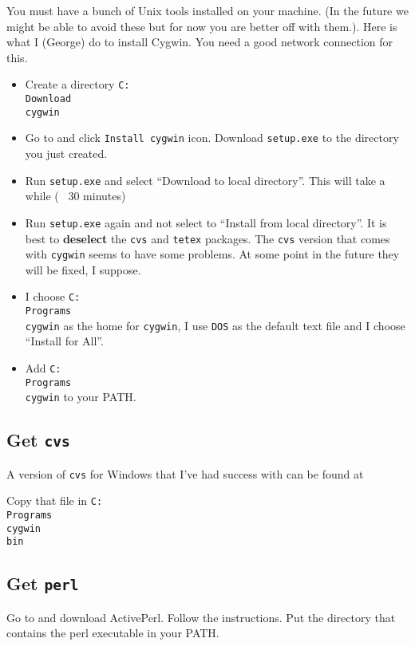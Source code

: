 \documentclass{book}
\def\t#1{{\tt #1}}
\begin{document}
 You must have a bunch of Unix tools installed on your machine. (In the future
we might be able to avoid these but for now you are better off with them.).
Here is what I (George) do to install Cygwin. You need a good network
connection for this. 
\begin{itemize}
\item Create a directory \t{C:\\Download\\cygwin}
\item Go to  and click \t{Install
cygwin} icon. Download \t{setup.exe} to the directory you just created.
\item Run \t{setup.exe} and select ``Download to local directory''. This will
take a while (~ 30 minutes)
\item Run \t{setup.exe} again and not select to ``Install from local
directory''. It is best to {\bf deselect} the \t{cvs} and \t{tetex} packages.
The \t{cvs} version that comes with \t{cygwin} seems to have some problems. At
some point in the future they will be fixed, I suppose. 
\item I choose \t{C:\\Programs\\cygwin} as the home for \t{cygwin}, I use
\t{DOS} as the default text file and I choose ``Install for All''.
\item Add \t{C:\\Programs\\cygwin} to your PATH.
\end{itemize}

 \subsection{Get \t{cvs}}

 A version of \t{cvs} for Windows that I've had success with can be found at


 Copy that file in \t{C:\\Programs\\cygwin\\bin}

 \subsection{Get \t{perl}}

 Go to  and download ActivePerl. Follow
the instructions. Put the directory that contains the perl executable in your
PATH. 
\end{document}
